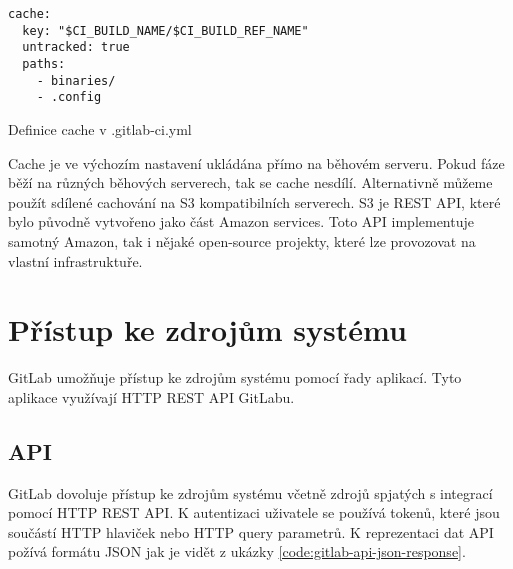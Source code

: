 \begin{listing}[ht]
\begin{verbatim}
cache:
  key: "$CI_BUILD_NAME/$CI_BUILD_REF_NAME"
  untracked: true
  paths:
    - binaries/
    - .config
\end{verbatim}
\caption{Definice cache v .gitlab-ci.yml}
\end{listing}
 
Cache je ve výchozím nastavení ukládána přímo na běhovém serveru.
Pokud fáze běží na různých běhových serverech, tak se cache nesdílí.
Alternativně můžeme použít sdílené cachování na S3 kompatibilních serverech.
S3 je REST API, které bylo původně vytvořeno jako část Amazon services.
Toto API implementuje samotný Amazon, tak i nějaké open-source projekty, které lze provozovat na vlastní infrastruktuře.


\section{Přístup ke zdrojům systému}

GitLab umožňuje přístup ke zdrojům systému pomocí řady aplikací.
Tyto aplikace využívají HTTP REST API GitLabu. 

\subsection{API}

GitLab dovoluje přístup ke zdrojům systému včetně zdrojů spjatých s integrací pomocí HTTP REST API.
K autentizaci uživatele se používá tokenů, které jsou součástí HTTP hlaviček nebo HTTP query parametrů.
K reprezentaci dat API požívá formátu JSON jak je vidět z ukázky \ref{code:gitlab-api-json-response}.

